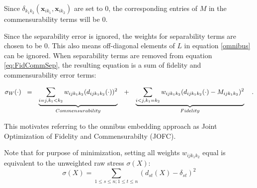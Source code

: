 \documentclass[11pt]{article} %
\begin{document}

Since ${ \delta_{k_1k_2}}(\bm{x}_{ik_1},\bm{x}_{ik_2}) $ are set to 0, the corresponding entries of $M$ in the commensurability terms will be 0.

Since    the separability error is ignored,  the weights for separability terms are chosen to be 0. This also means off-diagonal elements of $L$ in equation \eqref{omnibus} can be ignored. When separability terms are removed from equation \eqref{eq:FidCommSep}, the resulting equation  is a sum of fidelity and commensurability error terms:


\begin{align}
\sigma_W(\cdot)\hspace{3pt}   
\hspace{3pt}&=&\underbrace{\sum_{i=j,k_1< k_2}  {w_{ij{k_1}{k_2}}(d_{ij{k_1}{k_2}}(\cdot))^2}}_{Commensurability}  \hspace{10pt}  &  +&\underbrace{\sum_{i< j,k_1=k_2}  {w_{ij{k_1}{k_2}}(d_{ij{k_1}{k_2}}(\cdot)-M_{ijk_1k_2})^2  }  } _{Fidelity}\notag\label{eq:FidCommSep}\hspace{10pt} .
\end{align}

This motivates  referring to the omnibus embedding approach as Joint Optimization of Fidelity and Commensurabilty (JOFC).

Note that for purpose of minimization, setting all weights  ${w_{ij{k_1}{k_2}}}$ equal is equivalent to the unweighted raw stress $\sigma(X)$:
\begin{equation}
\sigma(X)=\sum_{1\leq s\leq n;1\leq t\leq n} {(d_{st}(X)-\delta_{st})^2  }\label{stress}
\end{equation}
\end{document}
